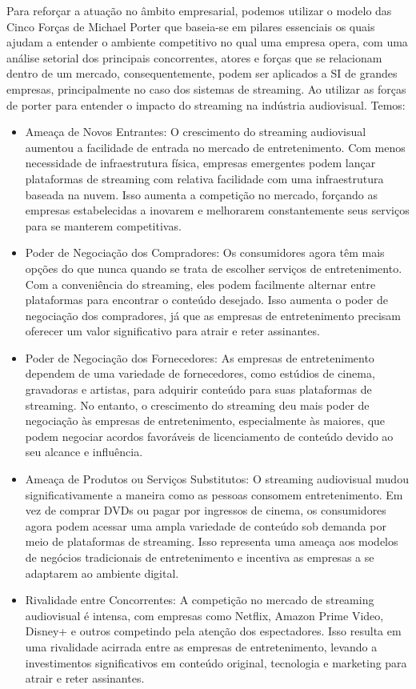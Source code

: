 \documentclass[conference]{IEEEtran}
\begin{document}
Para reforçar a atuação no âmbito empresarial, podemos utilizar o modelo das Cinco Forças de Michael Porter \cite{b10} que baseia-se em pilares essenciais os quais ajudam a entender o ambiente competitivo no qual uma empresa opera, com uma análise setorial dos principais concorrentes, atores e forças que se relacionam dentro de um mercado, consequentemente, podem ser aplicados a SI de grandes empresas, principalmente no caso dos sistemas de streaming.
Ao utilizar as forças de porter para entender o impacto do streaming na indústria audiovisual. Temos:
\begin{itemize}
    \item Ameaça de Novos Entrantes: O crescimento do streaming audiovisual aumentou a facilidade de entrada no mercado de entretenimento. Com menos necessidade de infraestrutura física, empresas emergentes podem lançar plataformas de streaming com relativa facilidade com uma infraestrutura baseada na nuvem. Isso aumenta a competição no mercado, forçando as empresas estabelecidas a inovarem e melhorarem constantemente seus serviços para se manterem competitivas.
    \item Poder de Negociação dos Compradores: Os consumidores agora têm mais opções do que nunca quando se trata de escolher serviços de entretenimento. Com a conveniência do streaming, eles podem facilmente alternar entre plataformas para encontrar o conteúdo desejado. Isso aumenta o poder de negociação dos compradores, já que as empresas de entretenimento precisam oferecer um valor significativo para atrair e reter assinantes.
    \item Poder de Negociação dos Fornecedores: As empresas de entretenimento dependem de uma variedade de fornecedores, como estúdios de cinema, gravadoras e artistas, para adquirir conteúdo para suas plataformas de streaming. No entanto, o crescimento do streaming deu mais poder de negociação às empresas de entretenimento, especialmente às maiores, que podem negociar acordos favoráveis de licenciamento de conteúdo devido ao seu alcance e influência.
    \item Ameaça de Produtos ou Serviços Substitutos: O streaming audiovisual mudou significativamente a maneira como as pessoas consomem entretenimento. Em vez de comprar DVDs ou pagar por ingressos de cinema, os consumidores agora podem acessar uma ampla variedade de conteúdo sob demanda por meio de plataformas de streaming. Isso representa uma ameaça aos modelos de negócios tradicionais de entretenimento e incentiva as empresas a se adaptarem ao ambiente digital.
    \item Rivalidade entre Concorrentes: A competição no mercado de streaming audiovisual é intensa, com empresas como Netflix, Amazon Prime Video, Disney+ e outros competindo pela atenção dos espectadores. Isso resulta em uma rivalidade acirrada entre as empresas de entretenimento, levando a investimentos significativos em conteúdo original, tecnologia e marketing para atrair e reter assinantes.
\end{itemize}
\end{document}
